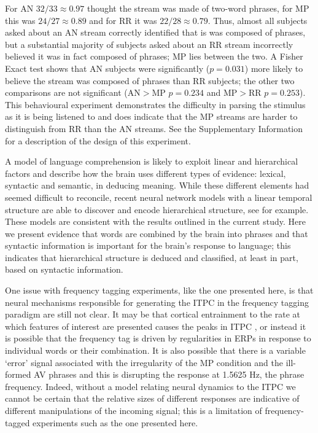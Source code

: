 \documentclass[11pt,a4wide]{article}
\newcommand{\citet}[1]{\cite{#1}}
\begin{document}
For AN $32/33\approx 0.97$ thought the stream was made of two-word
phrases, for MP this was $24/27\approx 0.89$ and for RR it was
$22/28\approx 0.79$. Thus, almost all subjects asked about an AN
stream correctly identified that is was composed of phrases, but a
substantial majority of subjects asked about an RR stream incorrectly
believed it was in fact composed of phrases; MP lies between the
two. A Fisher Exact test shows that AN subjects were significantly
($p=0.031$) more likely to believe the stream was composed of phrases
than RR subjects; the other two comparisons are not significant
(AN$>$MP $p=0.234$ and MP$>$RR $p=0.253$). This behavioural experiment
demonstrates the difficulty in parsing the stimulus as it is being
listened to and does indicate that the MP streams are harder to
distinguish from RR than the AN streams. See the Supplementary
Information for a description of the design of this experiment.

A model of language comprehension is likely to exploit linear and
hierarchical factors and describe how the brain uses different types
of evidence: lexical, syntactic and semantic, in deducing
meaning. While these different elements had seemed difficult to
reconcile, recent neural network models with a linear temporal
structure are able to discover and encode hierarchical structure, see
\citet{LakretzEtAl2019,Baroni2019} for example. These models are
consistent with the results outlined in the current study. Here we
present evidence that words are combined by the brain into phrases and
that syntactic information is important for the brain's response to
language; this indicates that hierarchical structure is deduced and
classified, at least in part, based on syntactic information.

One issue with frequency tagging experiments, like the one presented
here, is that neural mechanisms responsible for generating the ITPC in
the frequency tagging paradigm are still not clear. It may be that
cortical entrainment to the rate at which features of interest are
presented causes the peaks in ITPC \cite{Meyer2018}, or instead it is
possible that the frequency tag is driven by regularities in ERPs in
response to individual words or their combination. It is also possible
that there is a variable `error' signal associated with the
irregularity of the MP condition and the ill-formed AV phrases and
this is disrupting the response at 1.5625 Hz, the phrase
frequency. Indeed, without a model relating neural dynamics to the
ITPC we cannot be certain that the relative sizes of different
responses are indicative of different manipulations of the incoming
signal; this is a limitation of frequency-tagged experiments such as
the one presented here.
\end{document}
